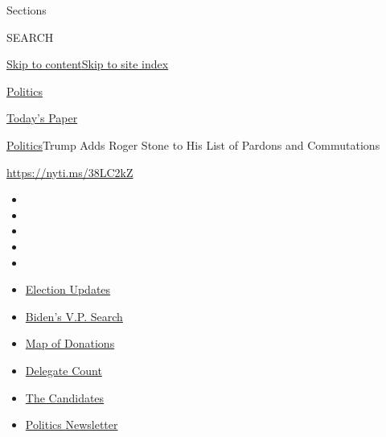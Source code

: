 Sections

SEARCH

\protect\hyperlink{site-content}{Skip to
content}\protect\hyperlink{site-index}{Skip to site index}

\href{https://www.nytimes.com/section/politics}{Politics}

\href{https://myaccount.nytimes.com/auth/login?response_type=cookie\&client_id=vi}{}

\href{https://www.nytimes.com/section/todayspaper}{Today's Paper}

\href{/section/politics}{Politics}\textbar{}Trump Adds Roger Stone to
His List of Pardons and Commutations

\url{https://nyti.ms/38LC2kZ}

\begin{itemize}
\item
\item
\item
\item
\item
\end{itemize}

\begin{itemize}
\item
  \href{https://www.nytimes.com/2020/07/31/us/elections/biden-vs-trump.html?action=click\&pgtype=Article\&state=default\&region=TOP_BANNER\&context=storylines_menu}{Election
  Updates}
\item
  \href{https://www.nytimes.com/article/biden-vice-president-2020.html?action=click\&pgtype=Article\&state=default\&region=TOP_BANNER\&context=storylines_menu}{Biden's
  V.P. Search}
\item
  \href{https://www.nytimes.com/interactive/2020/07/24/us/politics/trump-biden-campaign-donors.html?action=click\&pgtype=Article\&state=default\&region=TOP_BANNER\&context=storylines_menu}{Map
  of Donations}
\item
  \href{https://www.nytimes.com/interactive/2020/us/elections/delegate-count-primary-results.html?action=click\&pgtype=Article\&state=default\&region=TOP_BANNER\&context=storylines_menu}{Delegate
  Count}
\item
  \href{https://www.nytimes.com/interactive/2019/us/politics/2020-presidential-candidates.html?action=click\&pgtype=Article\&state=default\&region=TOP_BANNER\&context=storylines_menu}{The
  Candidates}
\item
  \href{https://www.nytimes.com/newsletters/politics?action=click\&pgtype=Article\&state=default\&region=TOP_BANNER\&context=storylines_menu}{Politics
  Newsletter}
\end{itemize}

